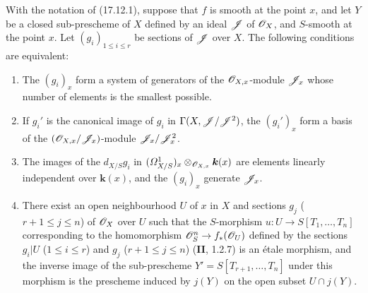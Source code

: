 \begin{corollary}[17.12.2]
\label{IV.17.12.2}
With the notation of (17.12.1), suppose that $f$ is smooth at the point $x$, and let $Y$ be a closed sub-prescheme of $X$ defined by an ideal $\mathscr{J}$ of $\mathscr{O}_X$, and $S$-smooth at the point $x$. Let $(g_i)_{1\leq i\leq r}$ be sections of $\mathscr{J}$ over $X$. The following conditions are equivalent:
\begin{enumerate}
  \item[\textup{a)}] The $(g_i)_x$ form a system of generators of the $\mathscr{O}_{X,x}$-module $\mathscr{J}_x$ whose number of elements is the smallest possible.
  \item[\textup{b)}] If $g_i'$ is the canonical image of $g_i$ in $\Gamma(X,\mathscr{J}/\mathscr{J}^2)$, the $(g_i')_x$ form a basis of the $(\mathscr{O}_{X,x}/\mathscr{J}_x)$-module $\mathscr{J}_x/\mathscr{J}_x^2$.


  \item[\textup{c)}] The images of the $d_{X/S}g_i$ in $(\varOmega^1_{X/S})_x\otimes_{\mathscr{O}_{X,x}}\boldsymbol{k}(x)$ are elements linearly independent over $\boldsymbol{k}(x)$, and the $(g_i)_x$ generate $\mathscr{J}_x$.
  \item[\textup{d)}] There exist an open neighbourhood $U$ of $x$ in $X$ and sections $g_j$ \textup{($r+1\leq j\leq n$)} of $\mathscr{O}_X$ over $U$ such that the $S$-morphism $u:U\to S[T_1,\ldots,T_n]$ corresponding to the homomorphism $\mathscr{O}_S^n\to f_*(\mathscr{O}_U)$ defined by the sections $g_i|U$ \textup{($1\leq i\leq r$)} and $g_j$ \textup{($r+1\leq j\leq n$)} \textup{(\textbf{II}, 1.2.7)} is an étale morphism, and the inverse image of the sub-prescheme $Y'=S[T_{r+1},\ldots,T_n]$ under this morphism is the prescheme induced by $j(Y)$ on the open subset $U\cap j(Y)$.
\end{enumerate}
\end{corollary}

